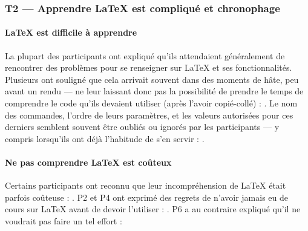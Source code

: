 \subsubsection{T2 --- Apprendre \LaTeX{} est compliqué et chronophage}

\paragraph{\LaTeX{} est difficile à apprendre}
La plupart des participants ont expliqué qu'ils attendaient généralement de rencontrer des problèmes pour se renseigner sur \LaTeX{} et ses fonctionnalités.
Plusieurs ont souligné que cela arrivait souvent dans des moments de hâte, peu avant un rendu --- ne leur laissant donc pas la possibilité de prendre le temps de comprendre le code qu'ils devaient utiliser (après l'avoir copié-collé) : .
Le nom des commandes, l'ordre de leurs paramètres, et les valeurs autorisées pour ces derniers semblent souvent être oubliés ou ignorés par les participants --- y compris lorsqu'ils ont déjà l'habitude de s'en servir : .

\paragraph{Ne pas comprendre \LaTeX{} est coûteux}
Certains participants ont reconnu que leur incompréhension de \LaTeX{} était parfois coûteuse : .
P2 et P4 ont exprimé des regrets de n'avoir jamais eu de cours sur \LaTeX{} avant de devoir l'utiliser : .
P6 a au contraire expliqué qu'il ne voudrait pas faire un tel effort : 

